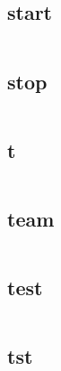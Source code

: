\subsection{start}


\begin{lstlisting}[language=bash]

\end{lstlisting}

\subsection{stop}



\begin{lstlisting}[language=bash]

\end{lstlisting}


\subsection{t}


\begin{lstlisting}[language=bash]

\end{lstlisting}

\subsection{team}



\begin{lstlisting}[language=bash]

\end{lstlisting}

\subsection{test}




\begin{lstlisting}[language=bash]

\end{lstlisting}

\subsection{tst}






\begin{lstlisting}[language=bash]

\end{lstlisting}

